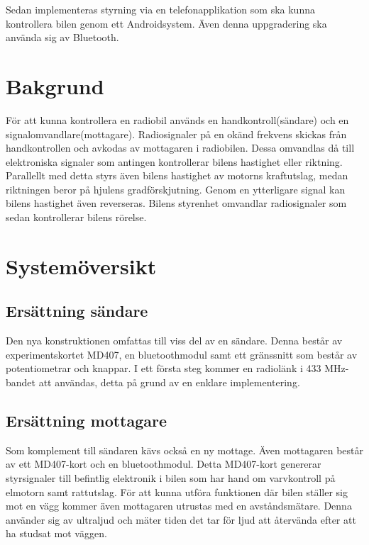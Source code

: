 \documentclass[a4paper]{article}
\begin{document}
Sedan implementeras styrning via en telefonapplikation som ska kunna kontrollera bilen genom ett Androidsystem. Även denna uppgradering ska använda sig av Bluetooth.


\section{Bakgrund}

För att kunna kontrollera en radiobil används en handkontroll(sändare) och en signalomvandlare(mottagare). Radiosignaler på en okänd frekvens skickas från handkontrollen och avkodas av mottagaren i radiobilen. Dessa omvandlas då till elektroniska signaler som antingen kontrollerar bilens hastighet eller riktning. Parallellt med detta styrs även bilens hastighet av motorns kraftutslag, medan riktningen beror på hjulens gradförskjutning. Genom en ytterligare signal kan bilens hastighet även reverseras. Bilens styrenhet omvandlar radiosignaler som sedan kontrollerar bilens rörelse.

\section{Systemöversikt}
\subsection{Ersättning sändare}
Den nya konstruktionen omfattas till viss del av en sändare. Denna består av experimentskortet MD407, en bluetoothmodul samt ett gränssnitt som består av potentiometrar och knappar. I ett första steg kommer en radiolänk i 433 MHz-bandet att användas, detta på grund av en enklare implementering.

\subsection{Ersättning mottagare}
Som komplement till sändaren kävs också en ny mottage. Även mottagaren består av ett MD407-kort och en bluetoothmodul. Detta MD407-kort genererar styrsignaler till befintlig elektronik i bilen som har hand om varvkontroll på elmotorn samt rattutslag.
För att kunna utföra funktionen där bilen ställer sig mot en vägg kommer även mottagaren utrustas med en avståndsmätare. Denna använder sig av ultraljud och mäter tiden det tar för ljud att återvända efter att ha studsat mot väggen.
\end{document}
